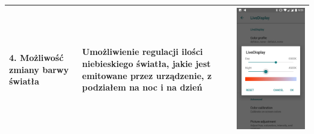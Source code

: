 \documentclass[12pt]{article}
\begin{document}
\begin{longtable}{|p{}|p{}|p{}|}
        4. Możliwość zmiany barwy światła & Umożliwienie regulacji ilości niebieskiego światła, jakie jest emitowane przez urządzenie, z podziałem na noc i na dzień & \includegraphics[scale=0.1]{changetemp.png}\\
        \hline

\end{longtable}
\end{document}
